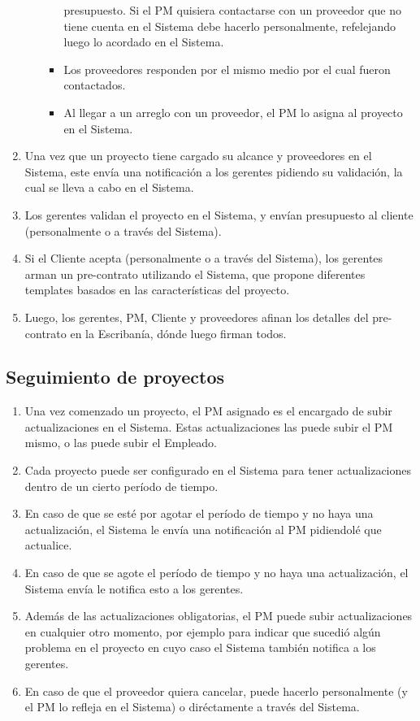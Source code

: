 \begin{enumerate}
\begin{itemize}
\begin{itemize}
                        presupuesto. Si el PM quisiera contactarse con un proveedor que no tiene cuenta en el Sistema debe hacerlo personalmente, refelejando luego lo acordado en el Sistema.
                    \item Los proveedores responden por el mismo medio por el cual fueron contactados.
                    \item Al llegar a un arreglo con un proveedor, el PM lo asigna al proyecto en el Sistema.
                \end{itemize}
        \end{itemize}
    \item Una vez que un proyecto tiene cargado su alcance y proveedores en el Sistema, este envía una notificación a los gerentes pidiendo su validación, la cual se lleva a cabo en el Sistema.
    \item Los gerentes validan el proyecto en el Sistema, y envían presupuesto al cliente (personalmente o a través del Sistema).
    \item Si el Cliente acepta (personalmente o a través del Sistema), los gerentes arman un pre-contrato utilizando el Sistema, que propone diferentes templates basados en las características del proyecto.
    \item Luego, los gerentes, PM, Cliente y proveedores afinan los detalles del pre-contrato en la Escribanía, dónde luego firman todos.
\end{enumerate}

\subsection{Seguimiento de proyectos}
\begin{enumerate}
    \item Una vez comenzado un proyecto, el PM asignado es el encargado de subir actualizaciones en el Sistema. Estas actualizaciones las puede subir el PM mismo, o las puede subir el Empleado.
    \item Cada proyecto puede ser configurado en el Sistema para tener actualizaciones dentro de un cierto período de tiempo.
    \item En caso de que se esté por agotar el período de tiempo y no haya una actualización, el Sistema le envía una notificación al PM pidiendolé que actualice.
    \item En caso de que se agote el período de tiempo y no haya una actualización, el Sistema envía le notifica esto a los gerentes.
    \item Además de las actualizaciones obligatorias, el PM puede subir actualizaciones en cualquier otro momento, por ejemplo para indicar que sucedió algún problema en el proyecto en cuyo caso el Sistema también notifica a los gerentes.
    \item En caso de que el proveedor quiera cancelar, puede hacerlo personalmente (y el PM lo refleja en el Sistema) o diréctamente a través del Sistema.
\end{enumerate}

